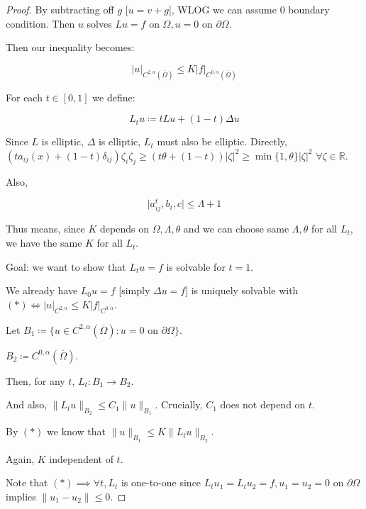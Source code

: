 \documentclass{article}
\theoremstyle{definition}
\begin{document}
\begin{proof}
    By subtracting off \(g\) [\(u = v + g\)], WLOG we can assume \(0\) boundary condition. Then \(u\) solves \(L u = f\) on \(\Omega, u = 0\) on \(\partial \Omega\).

    Then our inequality becomes:

    \[
        \vert u \vert_{C^{2,\alpha}(\overline{\Omega})} \leq K \vert f \vert_{C^{0,\alpha}(\overline{\Omega})}
    \]

    For each \(t\in [0,1]\) we define:

    \[
        L_t u \coloneqq t Lu + (1-t)\Delta u
    \]

    Since \(L\) is elliptic, \(\Delta\) is elliptic, \(L_t\) must also be elliptic. Directly, \((t a_{ij}(x) + (1-t) \delta_{ij})\zeta_i \zeta_j \geq (t \theta + (1-t)) \vert \zeta \vert^2 \geq \min\{1,\theta\} \vert \zeta \vert^2\) \(\forall \zeta \in \mathbb{R}\).

    Also,

    \[
        \vert a_{ij}^t, b_i, c \vert \leq \Lambda + 1
    \]

    Thus means, since \(K\) depends on \(\Omega , \Lambda, \theta\) and we can choose same \(\Lambda , \theta\) for all \(L_t\), we have the same \(K\) for all \(L_t\).

    Goal: we want to show that \(L_t u = f\) is solvable for \(t=1\).

    We already have \(L_0 u = f\) [simply \(\Delta u = f\)] is uniquely solvable with \((\ast) \iff \vert u \vert_{C^{2,\alpha}} \leq K \vert f \vert_{C^{0,\alpha}}\).
    
    Let \(B_1 \coloneqq \{ u \in C^{2,\alpha}(\overline{\Omega}): u = 0 \text{ on } \partial \Omega\}\).
    
    \(B_2 \coloneqq C^{0,\alpha}(\overline{\Omega})\).
    
    Then, for any \(t\), \(L_t:B_1 \to B_2\).

    And also, \(\lVert L_t u \rVert _{B_2} \leq C_1 \lVert u \rVert _{B_1}\). Crucially, \(C_1\) does not depend on \(t\).

    By \((\ast)\) we know that \(\lVert u \rVert _{B_1} \leq K \lVert L_t u \rVert _{B_2}\).

    Again, \(K\) independent of \(t\).

    Note that \((\ast) \implies \forall t, L_t\) is one-to-one since \(L_t u_1 = L_t u_2 = f, u_1=u_2=0\) on \(\partial \Omega\) implies \(\lVert u_1 - u_2 \rVert \leq 0\).


\end{proof}
\end{document}
